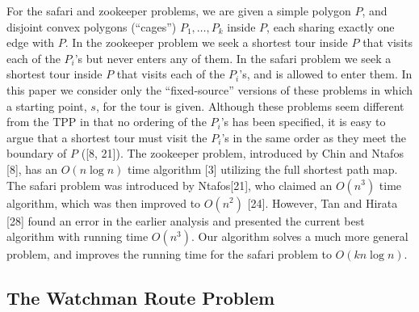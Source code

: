 \documentclass[a4paper]{article}
\begin{document}
For the safari and zookeeper problems, we are given a simple polygon \(P\), and disjoint convex polygons (“cages”) \(P_1, \dots, P_k\) inside \(P\), each sharing exactly one edge with \(P\). In the zookeeper problem we seek a shortest tour inside \(P\) that visits each of the \(P_i\)'s but never enters any of them. In the safari problem we seek a shortest tour inside \(P\) that visits each of the \(P_i\)'s, and is allowed to enter them. In this paper we consider only the “fixed-source” versions of these problems in which a starting point, \(s\), for the tour is given. Although these problems seem diﬀerent from the TPP in that no ordering of the \(P_i\)'s has been specified, it is easy to argue that a shortest tour must visit the \(P_i\)'s in the same order as they meet the boundary of \(P\) ([8, 21]). The zookeeper problem, introduced by Chin and Ntafos [8], has an \(O(n \log n)\) time algorithm [3] utilizing the full shortest path map. The safari problem was introduced by Ntafos[21], who claimed an \(O(n ^ 3)\) time algorithm, which was then improved to \(O(n ^ 2)\) [24]. However, Tan and Hirata [28] found an error in the earlier analysis and presented the current best algorithm with running time \(O(n ^ 3)\). Our algorithm solves a much more general problem, and improves the running time for the safari problem to \(O(kn \log n)\).

\subsection{The Watchman Route Problem}
\end{document}
